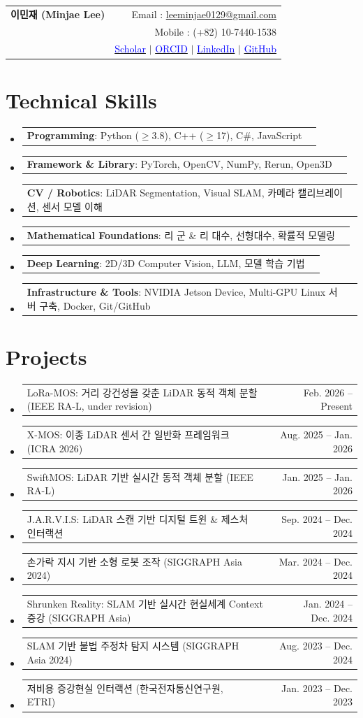\documentclass[letterpaper,11pt]{article}
\makeatletter
\newcommand{\resumeSkills}[1]{
  \item\small{
    \begin{tabular*}{0.97\textwidth}[t]{l@{\extracolsep{\fill}}r}
      #1
    \end{tabular*}\vspace{-2pt}
  }
}
\newcommand{\resumeSubHeadingListStart}{\begin{itemize}[leftmargin=*]}
\newcommand{\resumeSubHeadingListEnd}{\end{itemize}}
\makeatother
\begin{document}
\begin{tabular*}{\textwidth}{l@{\extracolsep{\fill}}r}
  \textbf{{\Large 이민재 (Minjae Lee)}} & Email : \href{mailto:leeminjae0129@gmail.com}{leeminjae0129@gmail.com} \\
  {} & Mobile : (+82) 10-7440-1538 \\
  {} & \href{https://scholar.google.com/citations?user=Ohcu4AwAAAAJ}{\textcolor{blue}{Scholar}} $|$ \href{https://orcid.org/0009-0005-2796-3207}{\textcolor{blue}{ORCID}} $|$ \href{https://www.linkedin.com/in/minjae-lee-9122bb252/}{\textcolor{blue}{LinkedIn}} $|$ \href{https://github.com/MinChoi0129}{\textcolor{blue}{GitHub}}
\end{tabular*}

\section{Technical Skills}
\resumeSubHeadingListStart
\resumeSkills{\textbf{Programming}: Python ($\geq$3.8), C++ ($\geq$17), C\#, JavaScript}
\resumeSkills{\textbf{Framework \& Library}: PyTorch, OpenCV, NumPy, Rerun, Open3D}
\resumeSkills{\textbf{CV / Robotics}: LiDAR Segmentation, Visual SLAM, 카메라 캘리브레이션, 센서 모델 이해}
\resumeSkills{\textbf{Mathematical Foundations}: 리 군 \& 리 대수, 선형대수, 확률적 모델링}
\resumeSkills{\textbf{Deep Learning}: 2D/3D Computer Vision, LLM, 모델 학습 기법}
\resumeSkills{\textbf{Infrastructure \& Tools}: NVIDIA Jetson Device, Multi-GPU Linux 서버 구축, Docker, Git/GitHub}
\resumeSubHeadingListEnd

\section{Projects}
\resumeSubHeadingListStart
\resumeSkills{LoRa-MOS: 거리 강건성을 갖춘 LiDAR 동적 객체 분할 (IEEE RA-L, under revision) & Feb. 2026 -- Present}
\resumeSkills{X-MOS: 이종 LiDAR 센서 간 일반화 프레임워크 (ICRA 2026) & Aug. 2025 -- Jan. 2026}
\resumeSkills{SwiftMOS: LiDAR 기반 실시간 동적 객체 분할 (IEEE RA-L) & Jan. 2025 -- Jan. 2026}
\resumeSkills{J.A.R.V.I.S: LiDAR 스캔 기반 디지털 트윈 \& 제스처 인터랙션 & Sep. 2024 -- Dec. 2024}
\resumeSkills{손가락 지시 기반 소형 로봇 조작 (SIGGRAPH Asia 2024) & Mar. 2024 -- Dec. 2024}
\resumeSkills{{\footnotesize Shrunken Reality: SLAM 기반 실시간 현실세계 Context 증강 (SIGGRAPH Asia)} & Jan. 2024 -- Dec. 2024}
\resumeSkills{SLAM 기반 불법 주정차 탐지 시스템 (SIGGRAPH Asia 2024) & Aug. 2023 -- Dec. 2024}
\resumeSkills{저비용 증강현실 인터랙션 (한국전자통신연구원, ETRI) & Jan. 2023 -- Dec. 2023}
\resumeSubHeadingListEnd
\end{document}
